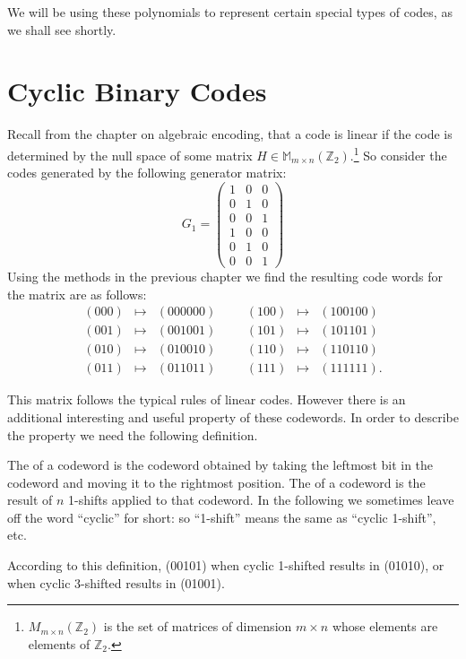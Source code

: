 We will be using these polynomials to represent certain special types of codes, as we shall see shortly.



\section{Cyclic Binary Codes}
\label{sec:PolynomialCodes:CyclicBinaryCodes}

  Recall from the chapter on algebraic encoding, that a code is linear if the code is determined by the null space of some matrix $H \in \mathbb{M}_{m\times n}(\mathbb{Z}_2).$\footnote{${M}_{m\times n}(\mathbb{Z}_2)$ is the set of matrices of dimension $m \times n$ whose elements are elements of $\mathbb{Z}_2$.}  So consider the codes generated by the following generator matrix:
\[
G_1 
= 
\begin{pmatrix}
1 & 0 & 0 \\
0 & 1 & 0 \\
0 & 0 & 1 \\
1 & 0 & 0 \\
0 & 1 & 0 \\
0 & 0 & 1 
\end{pmatrix}
\]
Using the methods in the previous chapter we find the resulting code words for the matrix are as follows:
\[
\begin{array}{rclccrcl}
(000) & \mapsto & (000000) & & & (100) & \mapsto & (100100) \\
(001) & \mapsto & (001001) & & & (101) & \mapsto & (101101) \\
(010) & \mapsto & (010010) & & & (110) & \mapsto & (110110) \\
(011) & \mapsto & (011011) & & & (111) & \mapsto & (111111).
\end{array}
\]

This matrix follows the typical rules of linear codes. However there is an additional interesting and useful property of these codewords.  In order to describe the property we need the following definition.

\begin{defn}{}
The   of a codeword is the codeword obtained by taking the leftmost bit in the codeword and moving it to the rightmost position. The   of a codeword is the result of $n$ 1-shifts applied to that codeword. In the following we sometimes leave off the word ``cyclic'' for short: so ``1-shift'' means the same as ``cyclic 1-shift'', etc.
\end {defn}
According to this definition, (00101) when cyclic 1-shifted results in (01010), or when cyclic 3-shifted results in (01001).

